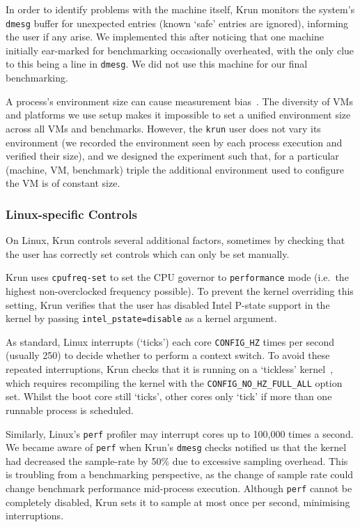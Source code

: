 \documentclass[preprint,numbers,10pt]{sigplanconf}
\newcommand{\krun}{Krun\xspace}
\begin{document}
In order to identify problems with the machine itself, \krun monitors the
system's \texttt{dmesg} buffer for unexpected entries (known `safe' entries
are ignored), informing the user if any arise. We implemented this after
noticing that one machine initially ear-marked for benchmarking occasionally
overheated, with the only clue to this being a line in \texttt{dmesg}.
We did not use this machine for our final benchmarking.

A process's environment size can cause measurement
bias~\cite{mytkowicz09surprising}. The diversity of VMs and platforms
we use setup makes it impossible to set a unified environment size across all VMs and
benchmarks. However, the \texttt{krun} user does not
vary its environment (we recorded the environment seen by each process
execution and verified their size), and we designed the experiment such that, for a particular (machine, VM,
benchmark) triple the additional environment used to configure the VM is of constant
size.


\subsubsection{Linux-specific Controls}

On Linux, \krun controls several additional factors, sometimes by checking that
the user has correctly set controls which can only be set manually.

\krun uses \texttt{cpufreq-set} to set the CPU governor to \texttt{performance} mode
(i.e.~the highest non-overclocked frequency possible).
To prevent the kernel overriding this setting, \krun verifies that the user has disabled
Intel P-state support in the kernel by passing
\texttt{intel\_pstate=disable} as a kernel argument.

As standard, Linux interrupts (`ticks') each core
\texttt{CONFIG\-\_HZ} times per second (usually 250) to
decide whether to perform a context switch. To avoid these repeated
interruptions, \krun checks that it is running on a `tickless'
kernel~\cite{tickless}, which requires recompiling the kernel with the
\texttt{CONFIG\_NO\_HZ\_FULL\_ALL} option set. Whilst the boot core still
`ticks', other cores only `tick' if more than one runnable process is scheduled.

Similarly, Linux's \texttt{perf} profiler may interrupt cores up to 100,000 times a
second. We became aware of \texttt{perf} when \krun's \texttt{dmesg} checks
notified us that the kernel had decreased the sample-rate by
50\% due to excessive sampling overhead. This is troubling
from a benchmarking perspective, as the change of sample rate could change
benchmark performance mid-process execution. Although
\texttt{perf} cannot be completely disabled, \krun sets it to sample at most
once per second, minimising interruptions.
\end{document}
